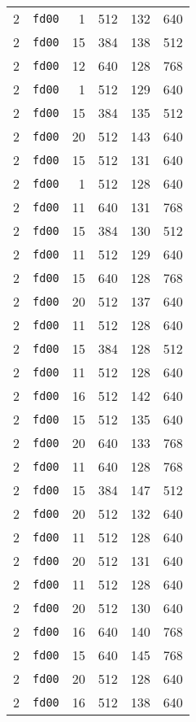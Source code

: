 \documentclass{article}
\begin{document}
\begin{table}[h!]
\begin{tabular}{llrrrl}
    2 & \texttt{fd00} & 1 & 512 & 132 & 640 \\
    2 & \texttt{fd00} & 15 & 384 & 138 & 512 \\
    2 & \texttt{fd00} & 12 & 640 & 128 & 768 \\
    2 & \texttt{fd00} & 1 & 512 & 129 & 640 \\
    2 & \texttt{fd00} & 15 & 384 & 135 & 512 \\
    2 & \texttt{fd00} & 20 & 512 & 143 & 640 \\
    2 & \texttt{fd00} & 15 & 512 & 131 & 640 \\
    2 & \texttt{fd00} & 1 & 512 & 128 & 640 \\
    2 & \texttt{fd00} & 11 & 640 & 131 & 768 \\
    2 & \texttt{fd00} & 15 & 384 & 130 & 512 \\
    2 & \texttt{fd00} & 11 & 512 & 129 & 640 \\
    2 & \texttt{fd00} & 15 & 640 & 128 & 768 \\
    2 & \texttt{fd00} & 20 & 512 & 137 & 640 \\
    2 & \texttt{fd00} & 11 & 512 & 128 & 640 \\
    2 & \texttt{fd00} & 15 & 384 & 128 & 512 \\
    2 & \texttt{fd00} & 11 & 512 & 128 & 640 \\
    2 & \texttt{fd00} & 16 & 512 & 142 & 640 \\
    2 & \texttt{fd00} & 15 & 512 & 135 & 640 \\
    2 & \texttt{fd00} & 20 & 640 & 133 & 768 \\
    2 & \texttt{fd00} & 11 & 640 & 128 & 768 \\
    2 & \texttt{fd00} & 15 & 384 & 147 & 512 \\
    2 & \texttt{fd00} & 20 & 512 & 132 & 640 \\
    2 & \texttt{fd00} & 11 & 512 & 128 & 640 \\
    2 & \texttt{fd00} & 20 & 512 & 131 & 640 \\
    2 & \texttt{fd00} & 11 & 512 & 128 & 640 \\
    2 & \texttt{fd00} & 20 & 512 & 130 & 640 \\
    2 & \texttt{fd00} & 16 & 640 & 140 & 768 \\
    2 & \texttt{fd00} & 15 & 640 & 145 & 768 \\
    2 & \texttt{fd00} & 20 & 512 & 128 & 640 \\
    2 & \texttt{fd00} & 16 & 512 & 138 & 640 \\

\end{tabular}
\end{table}
\end{document}
